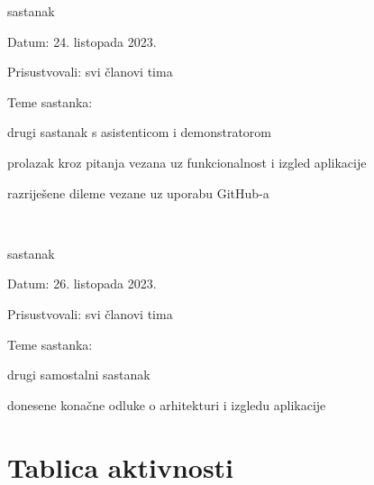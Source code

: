 \begin{packed_enum}
			\item  sastanak
			\item[] \begin{packed_item}
				\item Datum: 24. listopada 2023.
				\item Prisustvovali: svi članovi tima
				\item Teme sastanka:
				\begin{packed_item}
					\item  drugi sastanak s asistenticom i demonstratorom
					\item  prolazak kroz pitanja vezana uz funkcionalnost i izgled aplikacije
					\item  razriješene dileme vezane uz uporabu GitHub-a
				\end{packed_item}
			\end{packed_item}
			\text      \\
			
			\item  sastanak
			\item[] \begin{packed_item}
				\item Datum: 26. listopada 2023.
				\item Prisustvovali: svi članovi tima
				\item Teme sastanka:
				\begin{packed_item}
					\item  drugi samostalni sastanak
					\item  donesene konačne odluke o arhitekturi i izgledu aplikacije
				\end{packed_item}
			\end{packed_item}
			
			
		\end{packed_enum}
		
		\eject
		\section*{Tablica aktivnosti}
		

